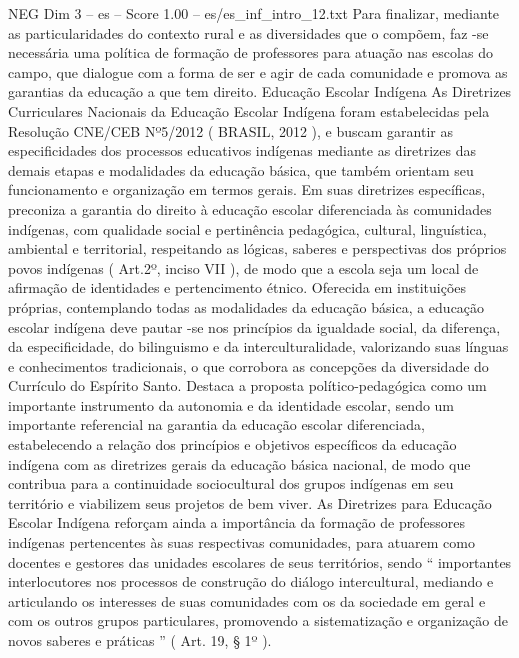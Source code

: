 \begin{textsample}{NEG Dim 3 – es – Score 1.00 – es/es\_inf\_intro\_12.txt}
Para finalizar, mediante as particularidades do contexto rural e as diversidades que o compõem, faz -se necessária uma política de formação de professores para atuação nas escolas do campo, que dialogue com a forma de ser e agir de cada comunidade e promova as garantias da educação a que tem direito.
Educação Escolar Indígena As Diretrizes Curriculares Nacionais da Educação Escolar Indígena foram estabelecidas pela Resolução CNE/CEB Nº5/2012 ( BRASIL, 2012 ), e buscam garantir as especificidades dos processos educativos indígenas mediante as diretrizes das demais etapas e modalidades da educação básica, que também orientam seu funcionamento e organização em termos gerais.
Em suas diretrizes específicas, preconiza a garantia do direito à educação escolar diferenciada às comunidades indígenas, com qualidade social e pertinência pedagógica, cultural, linguística, ambiental e territorial, respeitando as lógicas, saberes e perspectivas dos próprios povos indígenas ( Art.2º, inciso VII ), de modo que a escola seja um local de afirmação de identidades e pertencimento étnico.
Oferecida em instituições próprias, contemplando todas as modalidades da educação básica, a educação escolar indígena deve pautar -se nos princípios da igualdade social, da diferença, da especificidade, do bilinguismo e da interculturalidade, valorizando suas línguas e conhecimentos tradicionais, o que corrobora as concepções da diversidade do Currículo do Espírito Santo.
Destaca a proposta político-pedagógica como um importante instrumento da autonomia e da identidade escolar, sendo um importante referencial na garantia da educação escolar diferenciada, estabelecendo a relação dos princípios e objetivos específicos da educação indígena com as diretrizes gerais da educação básica nacional, de modo que contribua para a continuidade sociocultural dos grupos indígenas em seu território e viabilizem seus projetos de bem viver.
As Diretrizes para Educação Escolar Indígena reforçam ainda a importância da formação de professores indígenas pertencentes às suas respectivas comunidades, para atuarem como docentes e gestores das unidades escolares de seus territórios, sendo “ importantes interlocutores nos processos de construção do diálogo intercultural, mediando e articulando os interesses de suas comunidades com os da sociedade em geral e com os outros grupos particulares, promovendo a sistematização e organização de novos saberes e práticas ” ( Art. 19, § 1º ).

\end{textsample}
